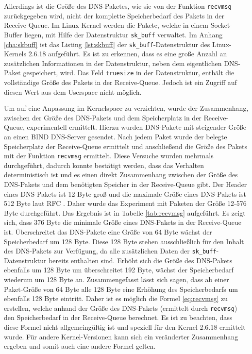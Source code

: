 \documentclass[a4paper, 12pt, BCOR10mm, DIV12, toc=bibliography, toc=listof, german]{scrbook}
\begin{document}
		Allerdings ist die Größe des DNS-Paketes, wie sie von der Funktion \texttt{recvmsg}
		zurückgegeben wird, nicht der komplette Speicherbedarf des Pakets in der Receive-Queue. Im
		Linux-Kernel werden die Pakete, welche in einem Socket-Buffer liegen, mit Hilfe der
		Datenstruktur \texttt{sk\_buff} verwaltet. Im Anhang \ref{cha:skbuff} ist das Listing
		\ref{lst:skbuff} der \texttt{sk\_buff}-Datenstruktur des Linux-Kernels 2.6.18 aufgeführt. Es ist
		zu erkennen, dass es eine große Anzahl an zusätzlichen Informationen in der Datenstruktur, neben
		dem eigentlichen DNS-Paket gespeichert, wird. Das Feld \texttt{truesize} in der Datenstruktur,
		enthält die vollständige Größe des Pakets in der Receive-Queue. Jedoch ist ein Zugriff auf
		diesen Wert aus dem Userspace nicht möglich.
		
		Um auf eine Anpassung im Kernelspace zu verzichten, wurde der Zusammenhang, zwischen der Größe
		des DNS-Pakets und dem Speicherplatz in der Receive-Queue, experimentell ermittelt. Hierzu
		wurden DNS-Pakete mit steigender Größe an einen BIND DNS-Server gesendet. Nach jedem Paket wurde
		der belegte Speicherplatz der Receive-Queue ermittelt und anschließend die Größe des Pakets mit
		der Funktion \texttt{recvmsg} ermittelt. Diese Versuche wurden mehrmals durchgeführt, dadurch
		konnte bestätigt werden, dass das Verhalten deterministisch ist und es einen direkt Zusammenhang
		zwischen der Größe des DNS-Pakets und dem benötigten Speicher in der Receive-Queue gibt. Der
		Header eines DNS-Pakets ist 12 Byte groß und die maximale Größe eines DNS-Pakets ist 512 Byte
		laut RFC \cite{rfc1035}. Daher wurde das Experiment mit Paketen der Größe 12-576 Byte
		durchgeführt. Das Ergebnis ist in Tabelle \ref{tab:recvmsg} aufgeführt. Es zeigt sich, dass 376
		Byte die minimale Größe eines DNS-Pakets in der Receive-Queue ist. Überschreitet das DNS-Pakete
		eine Größe von 64 Byte wächst der Speicherbedarf um 128 Byte. Diese 128 Byte stehen
		ausschließlich für den Inhalt des DNS-Pakets zur Verfügung, da alle zusätzlichen Daten der
		\texttt{sk\_buff}-Datenstruktur bereits enthalten sind. Erhöht sich die Größe des DNS-Pakets
		ebenfalls um 128 Byte um überschreitet 192 Byte, wächst der Speicherbedarf wiederum um 128 Byte
		an. Zusammengefasst lässt sich sagen, dass ab einer Paket-Größe von 64 Byte alle 128 Byte eine
		Erhöhung des Speicherbedarfs um ebenfalls 128 Byte eintritt. Daher ist es möglich die Formel
		\ref{eq:recvmsg} zu erstellen, welche anhand der Größe des DNS-Pakets (ermittelt durch
		\texttt{recvmsg}) den Speicherbedarf in der Receive-Queue berechnet. Es ist zu beachten, dass
		diese Formel nicht allgemeingültig ist und speziell für den Kernel 2.6.18 ermittelt wurde. Für
		andere Kernel-Versionen kann sich ein veränderter Zusammenhang ergeben und somit auch eine
		andere Formel gelten.		
\end{document}
